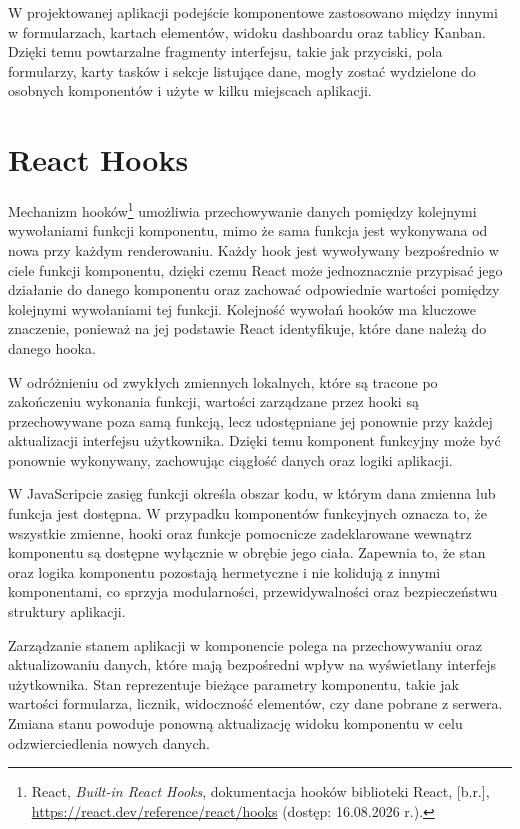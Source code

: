 \documentclass[12pt,a4paper,twoside]{report}
\newcommand{\FirstParagraph}{\noindent\ignorespaces}
\begin{document}
W projektowanej aplikacji podejście komponentowe zastosowano między innymi w formularzach, kartach elementów, widoku dashboardu oraz tablicy Kanban. Dzięki temu powtarzalne fragmenty interfejsu, takie jak przyciski, pola formularzy, karty tasków i sekcje listujące dane, mogły zostać wydzielone do osobnych komponentów i użyte w kilku miejscach aplikacji.

\section{React Hooks}

\FirstParagraph Mechanizm hooków\footnote{React, \emph{Built-in React Hooks}, dokumentacja hooków biblioteki React, [b.r.], \url{https://react.dev/reference/react/hooks} (dostęp: 16.08.2026 r.).} umożliwia przechowywanie danych pomiędzy kolejnymi wywołaniami funkcji komponentu, mimo że sama funkcja jest wykonywana od nowa przy każdym renderowaniu. Każdy hook jest wywoływany bezpośrednio w ciele funkcji komponentu, dzięki czemu React może jednoznacznie przypisać jego działanie do danego komponentu oraz zachować odpowiednie wartości pomiędzy kolejnymi wywołaniami tej funkcji. Kolejność wywołań hooków ma kluczowe znaczenie, ponieważ na jej podstawie React identyfikuje, które dane należą do danego hooka.

W odróżnieniu od zwykłych zmiennych lokalnych, które są tracone po zakończeniu wykonania funkcji, wartości zarządzane przez hooki są przechowywane poza samą funkcją, lecz udostępniane jej ponownie przy każdej aktualizacji interfejsu użytkownika. Dzięki temu komponent funkcyjny może być ponownie wykonywany, zachowując ciągłość danych oraz logiki aplikacji.

W JavaScripcie zasięg funkcji określa obszar kodu, w którym dana zmienna lub funkcja jest dostępna. W przypadku komponentów funkcyjnych oznacza to, że wszystkie zmienne, hooki oraz funkcje pomocnicze zadeklarowane wewnątrz komponentu są dostępne wyłącznie w obrębie jego ciała. Zapewnia to, że stan oraz logika komponentu pozostają hermetyczne i nie kolidują z innymi komponentami, co sprzyja modularności, przewidywalności oraz bezpieczeństwu struktury aplikacji.

Zarządzanie stanem aplikacji w komponencie polega na przechowywaniu oraz aktualizowaniu danych, które mają bezpośredni wpływ na wyświetlany interfejs użytkownika. Stan reprezentuje bieżące parametry komponentu, takie jak wartości formularza, licznik, widoczność elementów, czy dane pobrane z serwera. Zmiana stanu powoduje ponowną aktualizację widoku komponentu w celu odzwierciedlenia nowych danych.
\end{document}
